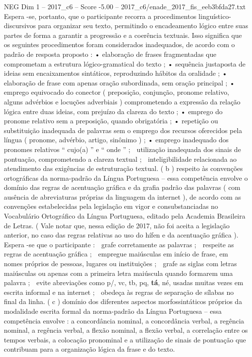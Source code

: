 \begin{textsample}{NEG Dim 1 – 2017\_c6 – Score -5.00 – 2017\_c6/enade\_2017\_fis\_eeb3bfda27.txt}
Espera -se, portanto, que o participante recorra a procedimentos linguístico-discursivos para organizar seu texto, permitindo o encadeamento lógico entre suas partes de forma a garantir a progressão e a coerência textuais.
Isso significa que os seguintes procedimentos foram considerados inadequados, de acordo com o padrão de resposta proposto : • elaboração de frases fragmentadas que comprometam a estrutura lógico-gramatical do texto ; • sequência justaposta de ideias sem encaixamentos sintáticos, reproduzindo hábitos da oralidade ; • elaboração de frase com apenas oração subordinada, sem oração principal ; • emprego equivocado do conector ( preposição, conjunção, pronome relativo, alguns advérbios e locuções adverbiais ) comprometendo a expressão da relação lógica entre duas ideias, com prejuízo da clareza do texto ; • emprego do pronome relativo sem a preposição, quando obrigatória ; • repetição ou substituição inadequada de palavras sem o emprego dos recursos oferecidos pela língua ( pronome, advérbio, artigo, sinônimo ) ; • emprego inadequado dos pronomes relativos “ cujo(a) ” e “ onde ” ;  utilização inadequada dos sinais de pontuação, comprometendo a clareza textual ;  inteligibilidade relacionada ao atendimento das exigências de estruturação textual. ( b ) respeito às convenções ortográficas da norma-padrão da Língua Portuguesa – essa competência envolve o domínio das regras de acentuação gráfica e da grafia padrão das palavras ( com ausência de abreviaturas próprias da linguagem da internet ), de acordo com as convenções estabelecidas pela legislação em vigor e consubstanciadas no Vocabulário Ortográfico da Língua Portuguesa, editado pela Academia Brasileira de Letras. ( Vale notar que, nessa edição de 2017, não foi aceita a legislação anterior, no caso das regras relativas ao uso do hífen e da acentuação gráfica ).
Espera -se que o participante :  grafe corretamente as palavras ;  respeite as regras de acentuação gráfica ;  empregue maiúsculas em início de frase, em nomes próprios de pessoas, lugares ou instituições ;  grafe as siglas com letras maiúsculas ou apenas com a primeira letra maiúscula quando formarem uma palavra ;  evite abreviações como p/, vc, tb, pq, \textbf{tá}, né, usadas muitas vezes em escrita informal e na internet ;  obedeça às regras de separação de sílabas no final da linha. ( c ) domínio dos diferentes aspectos morfossintáticos próprios da modalidade escrita formal da norma-padrão da Língua Portuguesa – essa competência envolve : a concordância nominal, a concordância verbal, a regência nominal, a regência verbal, a flexão nominal, a flexão verbal, a correlação entre os tempos verbais, a colocação pronominal e a utilização de sinais de pontuação que contribuam para a organização lógica da frase e do texto.

\end{textsample}
